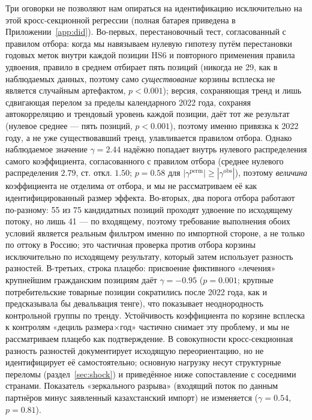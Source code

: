\documentclass[12pt]{article}
\begin{document}
Три оговорки не позволяют нам опираться на идентификацию исключительно на этой
кросс-секционной регрессии (полная батарея приведена в Приложении~\ref{app:did}). Во-первых,
перестановочный тест, согласованный с правилом отбора: когда мы навязываем нулевую гипотезу
путём перестановки годовых меток внутри каждой позиции HS6 и повторного применения правила
удвоения, правило в среднем отбирает пять позиций (никогда не 29, как в наблюдаемых данных,
поэтому само \emph{существование} корзины всплеска не является случайным артефактом,
$p < 0.001$); версия, сохраняющая тренд и лишь сдвигающая перелом за пределы календарного
2022 года, сохраняя автокорреляцию и трендовый уровень каждой позиции, даёт тот же результат
(нулевое среднее — пять позиций, $p < 0.001$), поэтому именно привязка к 2022 году, а не
уже существовавший тренд, улавливается правилом отбора. Однако наблюдаемое значение
$\gamma = 2.44$ надёжно попадает внутрь нулевого распределения самого коэффициента,
согласованного с правилом отбора (среднее нулевого распределения $2.79$, ст. откл. $1.50$;
$p = 0.58$ для $|\gamma^{\text{perm}}| \ge |\gamma^{\text{obs}}|$), поэтому \emph{величина}
коэффициента не отделима от отбора, и мы не рассматриваем её как идентифицированный размер
эффекта. Во-вторых, два порога отбора работают по-разному: 55 из 75 кандидатных позиций
проходят удвоение по исходящему потоку, но лишь 41 — по входящему, поэтому требование
выполнения обоих условий является реальным фильтром именно по импортной стороне, а не
только по оттоку в Россию; это частичная проверка против отбора корзины исключительно по
исходящему результату, который затем использует разность разностей. В-третьих, строка
плацебо: присвоение фиктивного «лечения» крупнейшим гражданским позициям даёт
$\gamma = -0.95$ ($p = 0.001$; крупные потребительские товарные позиции сократились после
2022 года, как и предсказывала бы девальвация тенге), что показывает неоднородность
контрольной группы по тренду. Устойчивость коэффициента по корзине всплеска к контролям
«дециль размера$\times$год» частично снимает эту проблему, и мы не рассматриваем плацебо как
подтверждение. В совокупности кросс-секционная разность разностей документирует исходящую
переориентацию, но не идентифицирует её самостоятельно; основную нагрузку несут структурные
переломы (раздел~\ref{sec:shock}) и приведённое ниже сопоставление с соседними странами.
Показатель «зеркального разрыва» (входящий поток по данным партнёров минус заявленный
казахстанский импорт) не изменяется ($\gamma = 0.54$, $p = 0.81$).
\end{document}
